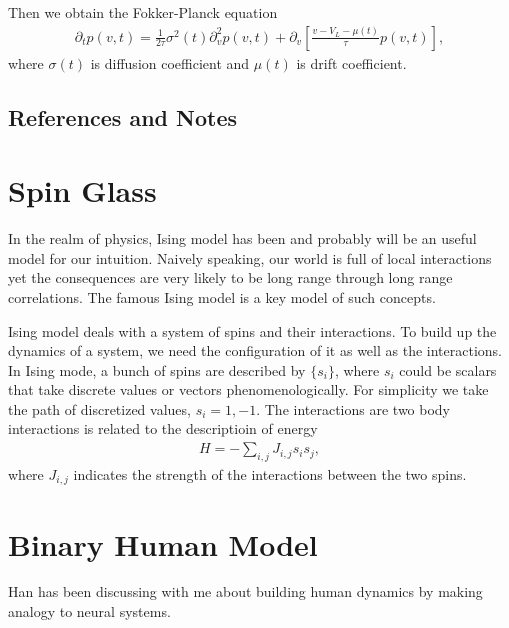 \documentclass[letterpaper,10pt,english]{sphinxmanual}
\begin{document}
Then we obtain the Fokker-Planck equation
\begin{equation*}
\begin{split}\partial_t  p(v,t) = \frac{1}{2\tau} \sigma^2(t) \partial^2_v p(v,t) + \partial_v \left[ \frac{ v - V_L - \mu(t) }{\tau} p(v,t) \right],\end{split}
\end{equation*}
where \(\sigma(t)\) is diffusion coefficient and \(\mu(t)\) is drift coefficient.


\subsection{References and Notes}
\label{\detokenize{topics/mean-field:references-and-notes}}

\section{Spin Glass}
\label{\detokenize{topics/spin-glass::doc}}\label{\detokenize{topics/spin-glass:spin-glass}}
In the realm of physics, Ising model has been and probably will be an useful model for our intuition. Naively speaking, our world is full of local interactions yet the consequences are very likely to be long range through long range correlations. The famous Ising model is a key model of such concepts.

Ising model deals with a system of spins and their interactions. To build up the dynamics of a system, we need the configuration of it as well as the interactions. In Ising mode, a bunch of spins are described by \(\{ s_i \}\), where \(s_i\) could be scalars that take discrete values or vectors phenomenologically. For simplicity we take the path of discretized values, \(s_i=1,-1\). The interactions are two body interactions is related to the descriptioin of energy
\begin{equation*}
\begin{split}H = - \sum_{i,j} J_{i,j} s_i s_j,\end{split}
\end{equation*}
where \(J_{i,j}\) indicates the strength of the interactions between the two spins.


\section{Binary Human Model}
\label{\detokenize{topics/binary-human-model::doc}}\label{\detokenize{topics/binary-human-model:binary-human-model}}
Han has been discussing with me about building human dynamics by making analogy to neural systems.
\end{document}
